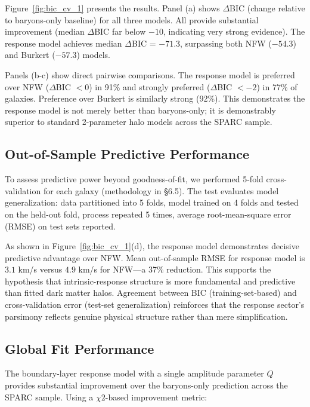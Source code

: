 \documentclass[11pt]{article}
\begin{document}
\FloatBarrier

Figure~\ref{fig:bic_cv_1} presents the results. Panel (a) shows $\Delta$BIC (change relative to baryons-only baseline) for all three models. All provide substantial improvement (median $\Delta$BIC far below $-10$, indicating very strong evidence). The response model achieves median $\Delta$BIC = $-71.3$, surpassing both NFW ($-54.3$) and Burkert ($-57.3$) models.

Panels (b-c) show direct pairwise comparisons. The response model is preferred over NFW ($\Delta$BIC $< 0$) in 91\% and strongly preferred ($\Delta$BIC $< -2$) in 77\% of galaxies. Preference over Burkert is similarly strong (92\%). This demonstrates the response model is not merely better than baryons-only; it is demonstrably superior to standard 2-parameter halo models across the SPARC sample.

\subsection{Out-of-Sample Predictive Performance}\label{out-of-sample-predictive-performance}

To assess predictive power beyond goodness-of-fit, we performed 5-fold cross-validation for each galaxy (methodology in \S6.5). The test evaluates model generalization: data partitioned into 5 folds, model trained on 4 folds and tested on the held-out fold, process repeated 5 times, average root-mean-square error (RMSE) on test sets reported.

As shown in Figure~\ref{fig:bic_cv_1}(d), the response model demonstrates decisive predictive advantage over NFW. Mean out-of-sample RMSE for response model is $3.1$ km/s versus $4.9$ km/s for NFW---a 37\% reduction. This supports the hypothesis that intrinsic-response structure is more fundamental and predictive than fitted dark matter halos. Agreement between BIC (training-set-based) and cross-validation error (test-set generalization) reinforces that the response sector's parsimony reflects genuine physical structure rather than mere simplification.

\subsection{Global Fit Performance}\label{global-fit-performance}

The boundary-layer response model with a single amplitude parameter \(Q\) provides substantial improvement over the baryons-only prediction across the SPARC sample. Using a \(\chi 2\)-based improvement metric:
\end{document}
